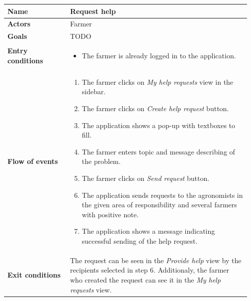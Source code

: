 \begin{table}[H]
    \centering
	\begin{tabular}{@{}p{0.25\linewidth} p{0.72\linewidth}@{}}
\toprule
		\textbf{Name}               & Request help\\
		\midrule
		\textbf{Actors}             & Farmer\\
		\midrule
		\textbf{Goals}              & TODO \\
		\midrule
		
		\textbf{Entry conditions}   & \begin{itemize}[leftmargin=.4cm,noitemsep,topsep=0pt,before=\vspace{-3mm},after=\vspace{-4mm}]
		    \item The farmer is already logged in to the application.
		\end{itemize}\\
		\midrule
		
		\textbf{Flow of events}     & \begin{enumerate}[leftmargin=.4cm,noitemsep,topsep=0pt,before=\vspace{-3mm},after=\vspace{-4mm}]
		    \item The farmer clicks on \textit{My help requests} view in the sidebar.
		    \item The farmer clicks on \textit{Create help request} button.
		    \item The application shows a pop-up with textboxes to fill.
		    \item The farmer enters topic and message describing of the problem.
		    \item The farmer clicks on \textit{Send request} button.
		    \item The application sends requests to the agronomists in the given area of responsibility and several farmers with positive note. 
		    \item The application shows a message indicating successful sending of the help request.
		\end{enumerate}\\
		\midrule
		\textbf{Exit conditions}    & The request can be seen in the \textit{Provide help} view by the recipients selected in step 6. Additionaly, the farmer who created the request can see it in the \textit{My help requests} view. \\
		\midrule
		

\end{tabular}
\end{table}
